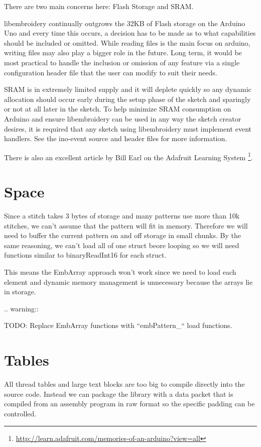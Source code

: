 \documentclass[a4paper]{report}
\begin{document}
There are two main concerns here: Flash Storage and SRAM.

libembroidery continually outgrows the 32KB of Flash storage on the
Arduino Uno and every time this occurs, a decision has to be made as to
what capabilities should be included or omitted. While reading files is
the main focus on arduino, writing files may also play a bigger role
in the future. Long term, it would be most practical to handle the
inclusion or omission of any feature via a single configuration header
file that the user can modify to suit their needs.

SRAM is in extremely limited supply and it will deplete quickly so any
dynamic allocation should occur early during the setup phase of the
sketch and sparingly or not at all later in the sketch. To help minimize
SRAM consumption on Arduino and ensure libembroidery can be used in any
way the sketch creator desires, it is required that any sketch using
libembroidery must implement event handlers. See the ino-event source
and header files for more information.

There is also an excellent article by Bill Earl on the Adafruit Learning
System
\footnote{\url{http://learn.adafruit.com/memories-of-an-arduino?view=all}}.

\section{Space}

Since a stitch takes 3 bytes of storage and many patterns use more than
10k stitches, we can't assume that the pattern will fit in memory. Therefore
we will need to buffer the current pattern on and off storage in small
chunks. By the same reasoning, we can't load all of one struct beore
looping so we will need functions similar to binaryReadInt16 for each
struct.

This means the EmbArray approach won't work since we need to load
each element and dynamic memory management is unnecessary because
the arrays lie in storage.

.. warning::

   TODO: Replace EmbArray functions with ``embPattern\_`` load functions.

\section{Tables}

All thread tables and large text blocks are too big to compile directly
into the source code. Instead we can package the library with a data packet
that is compiled from an assembly program in raw format so the specific
padding can be controlled.
\end{document}
